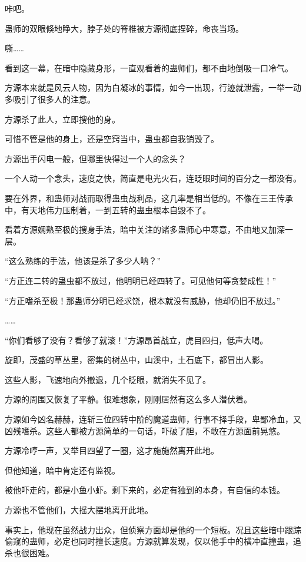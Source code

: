 \begin{this_body}
咔吧。

蛊师的双眼倏地睁大，脖子处的脊椎被方源彻底捏碎，命丧当场。

嘶……

看到这一幕，在暗中隐藏身形，一直观看着的蛊师们，都不由地倒吸一口冷气。

方源本来就是风云人物，因为白凝冰的事情，如今一出现，行迹就泄露，一举一动多吸引了很多人的注意。

方源杀了此人，立即搜他的身。

可惜不管是他的身上，还是空窍当中，蛊虫都自我销毁了。

方源出手闪电一般，但哪里快得过一个人的念头？

一个人动一个念头，速度之快，简直是电光火石，连眨眼时间的百分之一都没有。

要在外界，和蛊师对战而取得蛊虫战利品，这几率是相当低的。不像在三王传承中，有天地伟力压制着，一到五转的蛊虫根本自毁不了。

看着方源娴熟至极的搜身手法，暗中关注的诸多蛊师心中寒意，不由地又加深一层。

“这么熟练的手法，他该是杀了多少人呐？”

“方正连二转的蛊虫都不放过，他明明已经四转了。可见他何等贪婪成性！”

“方正嗜杀至极！那蛊师分明已经求饶，根本就没有威胁，他却仍旧不放过。”

……

“你们看够了没有？看够了就滚！”方源昂首战立，虎目四扫，低声大喝。

旋即，茂盛的草丛里，密集的树丛中，山溪中，土石底下，都冒出人影。

这些人影，飞速地向外撤退，几个眨眼，就消失不见了。

方源的周围又恢复了平静。很难想象，刚刚居然有这么多人潜伏着。

方源如今凶名赫赫，连斩三位四转中阶的魔道蛊师，行事不择手段，卑鄙冷血，又凶残嗜杀。这些人都被方源简单的一句话，吓破了胆，不敢在方源面前晃悠。

方源冷哼一声，又举目四望了一圈，这才施施然离开此地。

但他知道，暗中肯定还有监视。

被他吓走的，都是小鱼小虾。剩下来的，必定有独到的本身，有自信的本钱。

方源也不管他们，大摇大摆地离开此地。

事实上，他现在虽然战力出众，但侦察方面却是他的一个短板。况且这些暗中跟踪偷窥的蛊师，必定也同时擅长速度。方源就算发现，仅以他手中的横冲直撞蛊，追杀也很困难。


\end{this_body}
